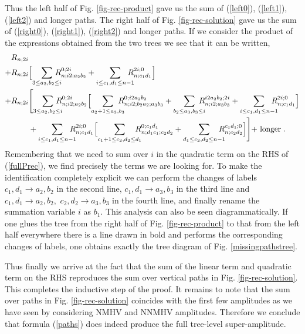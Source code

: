 \documentclass[12pt]{article}
\begin{document}
{Thus the left half of Fig. \ref{fig-rec-product} gave us the sum of (\ref{left0}), (\ref{left1}), (\ref{left2}) and longer paths. The right half of Fig. \ref{fig-rec-solution} gave us the sum of (\ref{right0}), (\ref{right1}), (\ref{right2}) and longer paths. If we consider the product of the expressions obtained from the two trees we see that it can be written,
\begin{align}
&R_{n;2i} \notag \\
+&R_{n;2i} \Bigl[\sum_{3\leq a_2,b_2 \leq i} \!\!\!\!\!\! R_{n;i2;a_2b_2}^{0;2i} + \sum_{i\leq c_1,d_1 \leq n-1} \!\!\!\!\!\! R_{n;c_1d_1}^{2i;0}\Bigr] \notag \\
+&R_{n;2i} \Biggl[ \sum_{3\leq a_2,b_2 \leq i} \!\!\!\!\!\! R_{n;i2;a_2b_2}^{0;2i} \Bigl[\sum_{a_2+1 \leq a_3,b_3} \!\!\!\!\!\! R_{n;i2;b_2a_2;a_3b_3}^{0;i2a_2b_2} + \sum_{b_2 \leq a_3,b_3 \leq i} \!\!\!\!\!\! R_{n;i2;a_3b_3}^{i2a_2b_2;2i} + \sum_{i\leq c_1,d_1 \leq n-1} \!\!\!\!\!\! R_{n;c_1d_1}^{2i;0} \Bigr] \notag\\
&\phantom{R_{n;2i}} +  \sum_{i\leq c_1,d_1 \leq n-1} \!\!\!\!\!\! R_{n;c_1d_1}^{2i;0} \Bigl[ \sum_{c_1+1 \leq c_2,d_2 \leq d_1} \!\!\!\!\!\! R_{n;d_1c_1;c_2d_2}^{0;c_1d_1} + \sum_{d_1 \leq c_2,d_2 \leq n-1} \!\!\!\!\!\! R_{n;c_2d_2}^{c_1d_1;0} \Bigr]\Biggl] + \text{ longer .}
\end{align}
Remembering that we need to sum over $i$ in the quadratic term on the RHS of (\ref{fullPrec}), we find precisely the terms we are looking for.
To make the identification completely explicit we can perform the changes of labels $c_1,d_1 \rightarrow a_2,b_2$ in the second line, $c_1,d_1 \rightarrow a_3,b_3$ in the third line and $c_1,d_1 \rightarrow a_2,b_2, \,\, c_2,d_2 \rightarrow a_3,b_3$ in the fourth line, and finally rename the summation variable $i$ as $b_1$. This analysis can also be seen diagrammatically. If one glues the tree from the right half of Fig. \ref{fig-rec-product} to that from the left half everywhere there is a line drawn in bold and performs the corresponding changes of labels, one obtains exactly the tree diagram of Fig. \ref{missingpathstree}. 

Thus finally we arrive at the fact that the sum of the linear term and quadratic term on the RHS reproduces the sum over vertical paths in Fig. \ref{fig-rec-solution}. This completes the inductive step of the proof. It remains to note that the sum over paths in Fig. \ref{fig-rec-solution} coincides with the first few amplitudes as we have seen by considering NMHV and NNMHV amplitudes. Therefore we conclude that formula (\ref{paths}) does indeed produce the full tree-level super-amplitude.


}
\end{document}
